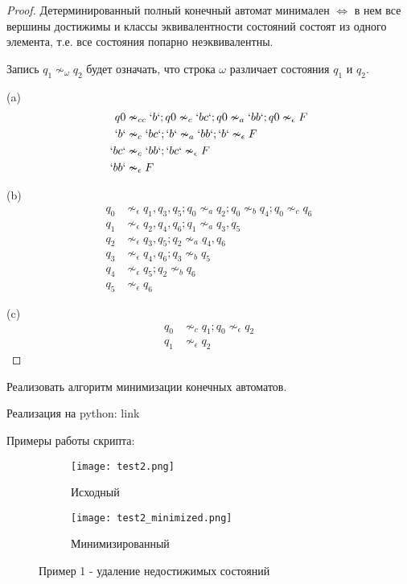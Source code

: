 \begin{proof}
    Детерминированный полный конечный автомат минимален $\Leftrightarrow$ 
    в нем все вершины достижимы и классы эквивалентности состояний 
    состоят из одного элемента, т.е. все состояния попарно неэквивалентны.

    Запись $q_1 \nsim_{\omega} q_2$ будет означать, 
    что строка $\omega$ различает состояния $q_1$ и $q_2$.  

    (a)
    \begin{align*}
        q0 &\nsim_{cc} \lq{b}\lq; q0 \nsim_{c} \lq bc \lq; q0 \nsim_{a} \lq bb \lq; q0 \nsim_{\epsilon} F \\
        \lq b \lq &\nsim_{c} \lq bc \lq; \lq b \lq \nsim_{a} \lq bb \lq; \lq b \lq \nsim_{\epsilon} F \\
        \lq bc \lq &\nsim_{c} \lq bb \lq; \lq bc \lq \nsim_{\epsilon} F \\
        \lq bb \lq &\nsim_{\epsilon} F
    \end{align*}

    (b)
    \begin{align*}
        q_0 &\nsim_{\epsilon} q_1, q_3, q_5; q_0 \nsim_{a} q_2; q_0 \nsim_{b} q_4; q_0 \nsim_{c} q_6   \\
        q_1 &\nsim_{\epsilon} q_2, q_4, q_6; q_1 \nsim_{a} q_3, q_5 \\
        q_2 &\nsim_{\epsilon} q_3, q_5; q_2 \nsim_{a} q_4, q_6 \\
        q_3 &\nsim_{\epsilon} q_4, q_6; q_3 \nsim_{b} q_5 \\
        q_4 &\nsim_{\epsilon} q_5; q_2 \nsim_{b} q_6 \\
        q_5 &\nsim_{\epsilon} q_6
    \end{align*}

    (c)
    \begin{align*}
        q_0 &\nsim_{c} q_1; q_0 \nsim_{\epsilon} q_2 \\
        q_1 &\nsim_{\epsilon} q_2
    \end{align*}
\end{proof}

\begin{problem}
    Реализовать алгоритм минимизации конечных автоматов.
\end{problem}

Реализация на python: link

Примеры работы скрипта:

\begin{figure}[h]
    \centering
    \begin{subfigure}[b]{0.4\linewidth}
      \texttt{[image: test2.png]}
      \caption{Исходный}
    \end{subfigure}
    \begin{subfigure}[b]{0.4\linewidth}
      \texttt{[image: test2\_minimized.png]}
      \caption{Минимизированный}
    \end{subfigure}
    \caption{Пример 1 - удаление недостижимых состояний}
\end{figure}

